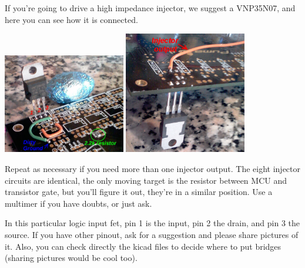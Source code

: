 \documentclass[12pt,a4paper,titlepage]{article}
\begin{document}
\begin{enumerate}
If you're going to drive a high impedance injector, we suggest a VNP35N07, and here you can see how it is connected.

\includegraphics[width = 0.4\textwidth]{images/injector_hack_front.jpeg}
\includegraphics[width = 0.4\textwidth]{images/injector_hack_back.png}

Repeat as necessary if you need more than one injector output. The eight injector circuits are identical, the only moving target is the resistor between MCU and transistor gate, but you'll figure it out, they're in a similar position. Use a multimer if you have doubts, or just ask.

In this particular logic input fet, pin 1 is the input, pin 2 the drain, and pin 3 the source. If you have other pinout, ask for a suggestion and please share pictures of it. Also, you can check directly the kicad files to decide where to put bridges (sharing pictures would be cool too).
\newline




\end{enumerate}
\end{document}
